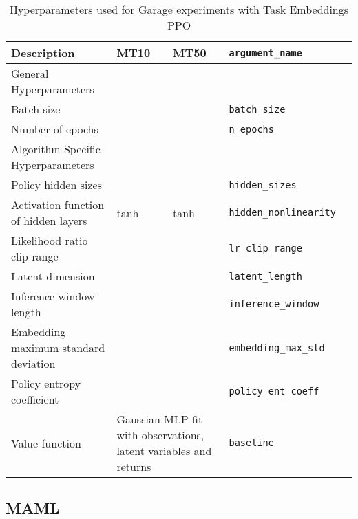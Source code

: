 \FloatBarrier

\begin{table}[h!]
\begin{tabularx}{\linewidth}{ l X X X l }
    \toprule
    \textbf{Description} & \textbf{MT10} & \textbf{MT50} & \texttt{argument\_name} \\
    \midrule
    General Hyperparameters \\
    \midrule
    Batch size &  &  & \texttt{batch\_size} \\
    Number of epochs &  &  & \texttt{n\_epochs} \\
    \midrule
    Algorithm-Specific Hyperparameters \\
    \midrule
    Policy hidden sizes &  &  & \texttt{hidden\_sizes} \\
    Activation function of hidden layers & tanh & tanh & \texttt{hidden\_nonlinearity} \\
    Likelihood ratio clip range &  &  & \texttt{lr\_clip\_range} \\
    Latent dimension &  &  & \texttt{latent\_length} \\
    Inference window length &  &  & \texttt{inference\_window} \\ 
    Embedding maximum standard deviation &  &  & \texttt{embedding\_max\_std} \\
    Policy entropy coefficient &  &  & \texttt{policy\_ent\_coeff} \\
    Value function & \multicolumn{2}{L{4.2cm}}{Gaussian MLP fit with observations, latent variables and returns} & \texttt{baseline} \\
    \bottomrule
\end{tabularx}
\caption{Hyperparameters used for Garage experiments with Task Embeddings PPO}
\label{tab:garage_te_hparams}
\end{table}

\FloatBarrier

\clearpage

\subsection{MAML}

\FloatBarrier

